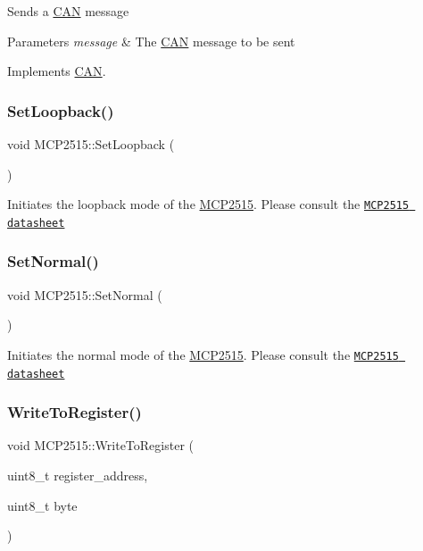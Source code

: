 Sends a \hyperlink{class_c_a_n}{C\+AN} message 
\begin{DoxyParams}{Parameters}
{\em message} & The \hyperlink{class_c_a_n}{C\+AN} message to be sent \\
\hline
\end{DoxyParams}


Implements \hyperlink{class_c_a_n_a6d9cf7beee73adaaa0be93426a078612}{C\+AN}.

\hypertarget{class_m_c_p2515_a7aac5fdb713b83933391348f1188f2b9}{}\label{class_m_c_p2515_a7aac5fdb713b83933391348f1188f2b9} 
\subsubsection{\texorpdfstring{Set\+Loopback()}{SetLoopback()}}
{\footnotesize\ttfamily void M\+C\+P2515\+::\+Set\+Loopback (\begin{DoxyParamCaption}{ }\end{DoxyParamCaption})}

Initiates the loopback mode of the \hyperlink{class_m_c_p2515}{M\+C\+P2515}. Please consult the \href{http://ww1.microchip.com/downloads/en/DeviceDoc/21801G.pdf}{\tt M\+C\+P2515 datasheet} \hypertarget{class_m_c_p2515_a58601a9d30863ebac441d641ddfac44e}{}\label{class_m_c_p2515_a58601a9d30863ebac441d641ddfac44e} 
\subsubsection{\texorpdfstring{Set\+Normal()}{SetNormal()}}
{\footnotesize\ttfamily void M\+C\+P2515\+::\+Set\+Normal (\begin{DoxyParamCaption}{ }\end{DoxyParamCaption})}

Initiates the normal mode of the \hyperlink{class_m_c_p2515}{M\+C\+P2515}. Please consult the \href{http://ww1.microchip.com/downloads/en/DeviceDoc/21801G.pdf}{\tt M\+C\+P2515 datasheet} \hypertarget{class_m_c_p2515_adbc005a5975b77b0aef74363f3832f9b}{}\label{class_m_c_p2515_adbc005a5975b77b0aef74363f3832f9b} 
\subsubsection{\texorpdfstring{Write\+To\+Register()}{WriteToRegister()}}
{\footnotesize\ttfamily void M\+C\+P2515\+::\+Write\+To\+Register (\begin{DoxyParamCaption}\item[{uint8\+\_\+t}]{register\+\_\+address,  }\item[{uint8\+\_\+t}]{byte }\end{DoxyParamCaption})\hspace{0.3cm}{\ttfamily [private]}}

